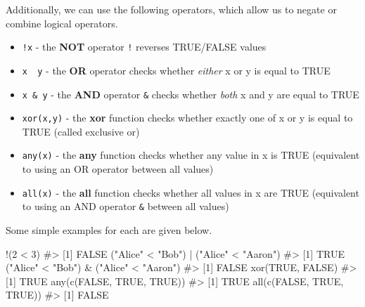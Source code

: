 \documentclass[
  letterpaper,
]{krantz}
\makeatletter
\newenvironment{Shaded}{\begin{snugshade}}{\end{snugshade}}
\newcommand{\CommentTok}[1]{\textcolor[rgb]{0.37,0.37,0.37}{#1}}
\newcommand{\ConstantTok}[1]{\textcolor[rgb]{0.56,0.35,0.01}{#1}}
\newcommand{\DecValTok}[1]{\textcolor[rgb]{0.68,0.00,0.00}{#1}}
\newcommand{\FunctionTok}[1]{\textcolor[rgb]{0.28,0.35,0.67}{#1}}
\newcommand{\NormalTok}[1]{\textcolor[rgb]{0.00,0.23,0.31}{#1}}
\newcommand{\SpecialCharTok}[1]{\textcolor[rgb]{0.37,0.37,0.37}{#1}}
\newcommand{\StringTok}[1]{\textcolor[rgb]{0.13,0.47,0.30}{#1}}
\providecommand{\tightlist}{%
  \setlength{\itemsep}{0pt}\setlength{\parskip}{0pt}}\usepackage{longtable,booktabs,array}
\newenvironment{kframe}{%
\medskip{}
\setlength{\fboxsep}{.8em}
 \def\at@end@of@kframe{}%
 \ifinner\ifhmode%
  \def\at@end@of@kframe{\end{minipage}}%
  \begin{minipage}{\columnwidth}%
 \fi\fi%
 \def\FrameCommand##1{\hskip\@totalleftmargin \hskip-\fboxsep
 \colorbox{shadecolor}{##1}\hskip-\fboxsep
     \hskip-\linewidth \hskip-\@totalleftmargin \hskip\columnwidth}%
 \MakeFramed {\advance\hsize-\width
   \@totalleftmargin\z@ \linewidth\hsize
   \@setminipage}}%
 {\par\unskip\endMakeFramed%
 \at@end@of@kframe}
\renewenvironment{Shaded}{\begin{kframe}}{\end{kframe}}
\makeatother
\begin{document}
Additionally, we can use the following operators, which allow us to
negate or combine logical operators.

\begin{itemize}
\tightlist
\item
  \texttt{!x} - the \textbf{NOT} operator \texttt{!} reverses TRUE/FALSE
  values
\item
  \texttt{x\ \textbar{}\ y} - the \textbf{OR} operator
  \texttt{\textbar{}} checks whether \emph{either} x or y is equal to
  TRUE
\item
  \texttt{x\ \&\ y} - the \textbf{AND} operator \texttt{\&} checks
  whether \emph{both} x and y are equal to TRUE
\item
  \texttt{xor(x,y)} - the \textbf{xor} function checks whether exactly
  one of x or y is equal to TRUE (called exclusive or)
\item
  \texttt{any(x)} - the \textbf{any} function checks whether any value
  in x is TRUE (equivalent to using an OR operator \texttt{\textbar{}}
  between all values)
\item
  \texttt{all(x)} - the \textbf{all} function checks whether all values
  in x are TRUE (equivalent to using an AND operator \texttt{\&} between
  all values)
\end{itemize}

Some simple examples for each are given below.

\begin{Shaded}
\begin{Highlighting}[]
\SpecialCharTok{!}\NormalTok{(}\DecValTok{2} \SpecialCharTok{\textless{}} \DecValTok{3}\NormalTok{)}
\CommentTok{\#\textgreater{} [1] FALSE}
\NormalTok{(}\StringTok{"Alice"} \SpecialCharTok{\textless{}} \StringTok{"Bob"}\NormalTok{) }\SpecialCharTok{|}\NormalTok{ (}\StringTok{"Alice"} \SpecialCharTok{\textless{}} \StringTok{"Aaron"}\NormalTok{)}
\CommentTok{\#\textgreater{} [1] TRUE}
\NormalTok{(}\StringTok{"Alice"} \SpecialCharTok{\textless{}} \StringTok{"Bob"}\NormalTok{) }\SpecialCharTok{\&}\NormalTok{ (}\StringTok{"Alice"} \SpecialCharTok{\textless{}} \StringTok{"Aaron"}\NormalTok{)}
\CommentTok{\#\textgreater{} [1] FALSE}
\FunctionTok{xor}\NormalTok{(}\ConstantTok{TRUE}\NormalTok{, }\ConstantTok{FALSE}\NormalTok{)}
\CommentTok{\#\textgreater{} [1] TRUE}
\FunctionTok{any}\NormalTok{(}\FunctionTok{c}\NormalTok{(}\ConstantTok{FALSE}\NormalTok{, }\ConstantTok{TRUE}\NormalTok{, }\ConstantTok{TRUE}\NormalTok{))}
\CommentTok{\#\textgreater{} [1] TRUE}
\FunctionTok{all}\NormalTok{(}\FunctionTok{c}\NormalTok{(}\ConstantTok{FALSE}\NormalTok{, }\ConstantTok{TRUE}\NormalTok{, }\ConstantTok{TRUE}\NormalTok{))}
\CommentTok{\#\textgreater{} [1] FALSE}
\end{Highlighting}
\end{Shaded}
\end{document}
